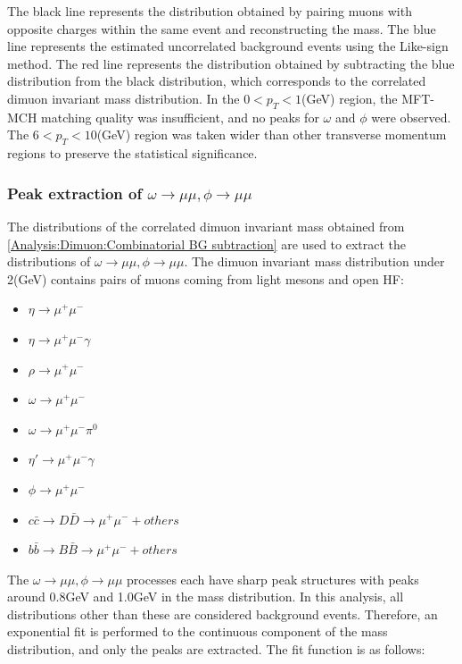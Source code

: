                 The black line represents the distribution obtained by pairing muons with opposite charges within the same event and reconstructing the mass. The blue line represents the estimated uncorrelated background events using the Like-sign method. The red line represents the distribution obtained by subtracting the blue distribution from the black distribution, which corresponds to the correlated dimuon invariant mass distribution. In the $0 < p_T < 1$(GeV) region, the MFT-MCH matching quality was insufficient, and no peaks for $\omega$ and $\phi$ were observed. The $6 < p_T < 10$(GeV) region was taken wider than other transverse momentum regions to preserve the statistical significance.
        
            \subsubsection{Peak extraction of $\omega \rightarrow \mu\mu ,\phi \rightarrow \mu\mu$}
            \label{Peak_extraction}
                The distributions of the correlated dimuon invariant mass obtained from \ref{Analysis:Dimuon:Combinatorial BG subtraction} are used to extract the distributions of $\omega \rightarrow \mu\mu,\phi \rightarrow \mu\mu$. The dimuon invariant mass distribution under 2(GeV) contains pairs of muons coming from light mesons and open HF:
                \begin{itemize}
                    \item $\eta \rightarrow \mu^+ \mu^-$
                    \item $\eta \rightarrow \mu^+ \mu^- \gamma$
                    \item $\rho \rightarrow \mu^+ \mu^-$
                    \item $\omega \rightarrow \mu^+ \mu^-$
                    \item $\omega \rightarrow \mu^+ \mu^- \pi^0$
                    \item $\eta' \rightarrow \mu^+ \mu^- \gamma$
                    \item $\phi \rightarrow \mu^+ \mu^-$
                    \item $c\bar{c} \rightarrow D\bar{D} \rightarrow \mu^+ \mu^- + others$
                    \item $b\bar{b} \rightarrow B\bar{B} \rightarrow \mu^+ \mu^- + others$
                \end{itemize}
                The $\omega \rightarrow \mu\mu,\phi \rightarrow \mu\mu$ processes each have sharp peak structures with peaks around 0.8GeV and 1.0GeV in the mass distribution. In this analysis, all distributions other than these are considered background events. Therefore, an exponential fit is performed to the continuous component of the mass distribution, and only the peaks are extracted. The fit function is as follows:

